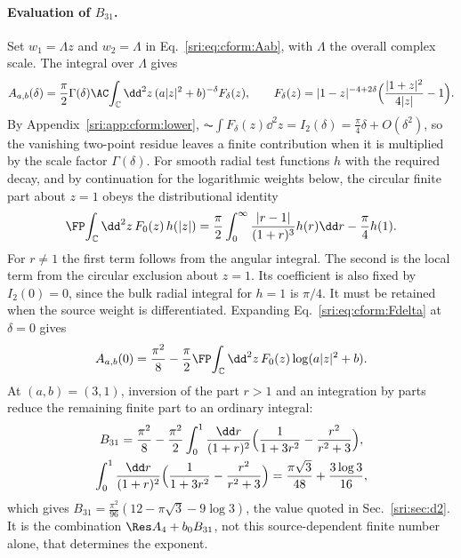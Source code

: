 \paragraph{Evaluation of $B_{31}$.} Set $w_1=\Lambda z$ and $w_2=\Lambda$ in Eq.~\eqref{sri:eq:cform:Aab}, with $\Lambda$
the overall complex scale. The integral over $\Lambda$ gives
\begin{equation}
 A_{a,b}(\delta)=\frac\pi2\Gamma(\delta)\AC\!\int_{\mathbb C}\dd^2z\,(a|z|^2+b)^{-\delta}F_\delta(z),\qquad
 F_\delta(z)=|1-z|^{-4+2\delta}\Bigl(\frac{|1+z|^2}{4|z|}-1\Bigr).
 \label{sri:eq:cform:Fdelta}
\end{equation}
By Appendix~\ref{sri:app:cform:lower}, $\AC\!\int F_\delta(z)\dd^2z=I_2(\delta)=\frac\pi4\delta+O(\delta^2)$, so the
vanishing two-point residue leaves a finite contribution when it is multiplied by the scale factor $\Gamma(\delta)$.
For smooth radial test functions $h$ with the required decay, and by continuation for the logarithmic weights below,
the circular finite part about $z=1$ obeys the distributional identity
\begin{equation}
 \FP\!\int_{\mathbb C}\dd^2z\,F_0(z)\,h(|z|)=\frac\pi2\int_0^\infty\frac{|r-1|}{(1+r)^3}h(r)\dd r-\frac\pi4h(1).
 \label{sri:eq:cform:radialfp}
\end{equation}
For $r\ne1$ the first term follows from the angular integral. The second is the local term from the circular exclusion
about $z=1$. Its coefficient is also fixed by $I_2(0)=0$, since the bulk radial integral for $h=1$ is $\pi/4$. It must
be retained when the source weight is differentiated. Expanding Eq.~\eqref{sri:eq:cform:Fdelta} at $\delta=0$ gives
\begin{equation}
 A_{a,b}(0)=\frac{\pi^2}{8}-\frac\pi2\FP\!\int_{\mathbb C}\dd^2z\,F_0(z)\log(a|z|^2+b).
 \label{sri:eq:cform:Aab0}
\end{equation}
At $(a,b)=(3,1)$, inversion of the part $r>1$ and an integration by parts reduce the remaining finite part to an
ordinary integral:
\begin{gather}
 B_{31}=\frac{\pi^2}{8}-\frac{\pi^2}{2}\int_0^1\frac{\dd r}{(1+r)^2}\Bigl(\frac1{1+3r^2}-\frac{r^2}{r^2+3}\Bigr),\notag\\
 \int_0^1\frac{\dd r}{(1+r)^2}\Bigl(\frac1{1+3r^2}-\frac{r^2}{r^2+3}\Bigr)=\frac{\pi\sqrt3}{48}+\frac{3\log3}{16},
\end{gather}
which gives $B_{31}=\frac{\pi^2}{96}(12-\pi\sqrt3-9\log3)$, the value quoted in Sec.~\ref{sri:sec:d2}. It is the
combination $\Res A_4+b_0B_{31}$, not this source-dependent finite number alone, that determines the exponent.

